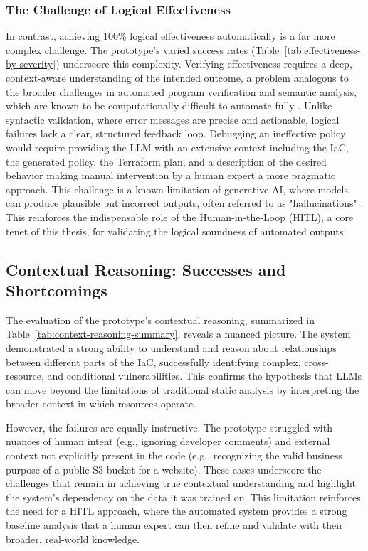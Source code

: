 \subsubsection{The Challenge of Logical Effectiveness}
In contrast, achieving 100\% logical effectiveness automatically is a far more complex challenge. The prototype's varied success rates (Table~\ref{tab:effectiveness-by-severity}) underscore this complexity. Verifying effectiveness requires a deep, context-aware understanding of the intended outcome, a problem analogous to the broader challenges in automated program verification and semantic analysis, which are known to be computationally difficult to automate fully \cite{katz_verifying_2017}. Unlike syntactic validation, where error messages are precise and actionable, logical failures lack a clear, structured feedback loop. Debugging an ineffective policy would require providing the LLM with an extensive context including the IaC, the generated policy, the Terraform plan, and a description of the desired behavior making manual intervention by a human expert a more pragmatic approach. This challenge is a known limitation of generative AI, where models can produce plausible but incorrect outputs, often referred to as "hallucinations" \cite{reversinglabs_why_2024}. This reinforces the indispensable role of the Human-in-the-Loop (HITL), a core tenet of this thesis, for validating the logical soundness of automated outputs

\subsection{Contextual Reasoning: Successes and Shortcomings}
The evaluation of the prototype's contextual reasoning, summarized in Table~\ref{tab:context-reasoning-summary}, reveals a nuanced picture. The system demonstrated a strong ability to understand and reason about relationships between different parts of the IaC, successfully identifying complex, cross-resource, and conditional vulnerabilities. This confirms the hypothesis that LLMs can move beyond the limitations of traditional static analysis by interpreting the broader context in which resources operate.

However, the failures are equally instructive. The prototype struggled with nuances of human intent (e.g., ignoring developer comments) and external context not explicitly present in the code (e.g., recognizing the valid business purpose of a public S3 bucket for a website). These cases underscore the challenges that remain in achieving true contextual understanding and highlight the system's dependency on the data it was trained on. This limitation reinforces the need for a HITL approach, where the automated system provides a strong baseline analysis that a human expert can then refine and validate with their broader, real-world knowledge.

